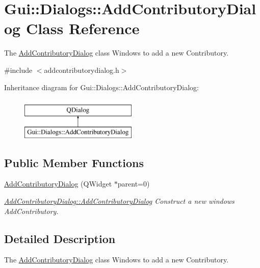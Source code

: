 \hypertarget{classGui_1_1Dialogs_1_1AddContributoryDialog}{\section{Gui\-:\-:Dialogs\-:\-:Add\-Contributory\-Dialog Class Reference}
\label{classGui_1_1Dialogs_1_1AddContributoryDialog}
}


The \hyperlink{classGui_1_1Dialogs_1_1AddContributoryDialog}{Add\-Contributory\-Dialog} class Windows to add a new Contributory.  




{\ttfamily \#include $<$addcontributorydialog.\-h$>$}

Inheritance diagram for Gui\-:\-:Dialogs\-:\-:Add\-Contributory\-Dialog\-:\begin{figure}[H]
\begin{center}
\leavevmode
\includegraphics[height=2.000000cm]{d5/de2/classGui_1_1Dialogs_1_1AddContributoryDialog}
\end{center}
\end{figure}
\subsection*{Public Member Functions}
\begin{DoxyCompactItemize}
\item 
\hyperlink{classGui_1_1Dialogs_1_1AddContributoryDialog_a40687642b2f2b15a61298ab18256867a}{Add\-Contributory\-Dialog} (Q\-Widget $\ast$parent=0)
\begin{DoxyCompactList}\small\item\em \hyperlink{classGui_1_1Dialogs_1_1AddContributoryDialog_a40687642b2f2b15a61298ab18256867a}{Add\-Contributory\-Dialog\-::\-Add\-Contributory\-Dialog} Construct a new windows Add\-Contributory. \end{DoxyCompactList}\end{DoxyCompactItemize}


\subsection{Detailed Description}
The \hyperlink{classGui_1_1Dialogs_1_1AddContributoryDialog}{Add\-Contributory\-Dialog} class Windows to add a new Contributory. 

